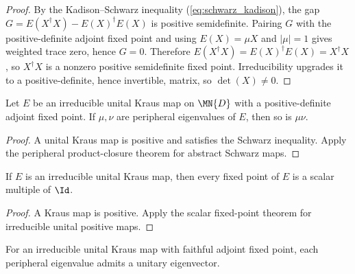\begin{proof}
    \leanok
    By the Kadison--Schwarz inequality
    (\ref{eq:schwarz_kadison}), the gap
    $G=E(X^\dagger X)-E(X)^\dagger E(X)$ is positive semidefinite.
    Pairing $G$ with the positive-definite adjoint fixed point and using
    $E(X)=\mu X$ and $|\mu|=1$ gives weighted trace zero, hence $G=0$.
    Therefore $E(X^\dagger X)=E(X)^\dagger E(X)=X^\dagger X$, so
    $X^\dagger X$ is a nonzero positive semidefinite fixed point.
    Irreducibility upgrades it to a positive-definite, hence invertible,
    matrix, so $\det(X)\ne 0$.
\end{proof}

\begin{lemma}%
    \label{lem:peripheral_mul_closure}
    \leanok
    Let $E$ be an irreducible unital Kraus map on $\MN{D}$ with a
    positive-definite adjoint fixed point.
    If $\mu, \nu$ are peripheral eigenvalues of $E$, then so is $\mu\nu$.
\end{lemma}

\begin{proof}\leanok
    A unital Kraus map is positive and satisfies the Schwarz inequality.
    Apply the peripheral product-closure theorem for abstract Schwarz maps.
\end{proof}

\begin{lemma}
    \label{lem:irreducible_unital_fixed_points_scalar}
    \leanok
    If $E$ is an irreducible unital Kraus map, then every fixed point of $E$ is a
    scalar multiple of $\Id$.
\end{lemma}

\begin{proof}\leanok
    A Kraus map is positive. Apply the scalar fixed-point theorem for
    irreducible unital positive maps.
\end{proof}

\begin{lemma}
    \label{lem:peripheral_unitary_eigenvector}
    \leanok
    For an irreducible unital Kraus map with faithful adjoint fixed point,
    each peripheral eigenvalue admits a unitary eigenvector.
\end{lemma}

